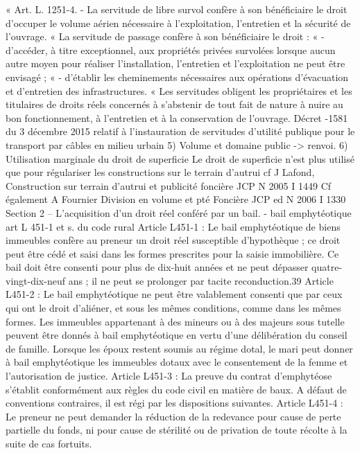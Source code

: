\documentclass[11pt,a4paper]{report}
\begin{document}
	« Art. L. 1251-4. - La servitude de libre survol confère à son bénéficiaire le droit d'occuper le volume aérien
	nécessaire à l'exploitation, l'entretien et la sécurité de l'ouvrage.
	« La servitude de passage confère à son bénéficiaire le droit :
	« - d'accéder, à titre exceptionnel, aux propriétés privées survolées lorsque aucun autre moyen pour réaliser
	l'installation, l'entretien et l'exploitation ne peut être envisagé ;
	« - d'établir les cheminements nécessaires aux opérations d'évacuation et d'entretien des infrastructures.
	« Les servitudes obligent les propriétaires et les titulaires de droits réels concernés à s'abstenir de tout fait de
	nature à nuire au bon fonctionnement, à l'entretien et à la conservation de l'ouvrage.
	Décret -1581 du 3 décembre 2015 relatif à l'instauration de servitudes d'utilité publique pour le transport
	par câbles en milieu urbain
	5) Volume et domaine public -> renvoi.
	6) Utilisation marginale du droit de superficie
	Le droit de superficie n’est plus utilisé que pour régulariser les constructions sur le terrain d’autrui cf J Lafond,
	Construction sur terrain d’autrui et publicité foncière JCP N 2005 I 1449
	Cf également A Fournier Division en volume et pté Foncière JCP ed N 2006 I 1330
	Section 2 – L’acquisition d’un droit réel conféré par un bail.
	- bail emphytéotique art L 451-1 et s. du code rural
	Article L451-1 : Le bail emphytéotique de biens immeubles confère au preneur un droit réel susceptible d'hypothèque ;
	ce droit peut être cédé et saisi dans les formes prescrites pour la saisie immobilière.
	Ce bail doit être consenti pour plus de dix-huit années et ne peut dépasser quatre-vingt-dix-neuf ans ; il ne peut se
	prolonger par tacite reconduction.39
	Article L451-2 : Le bail emphytéotique ne peut être valablement consenti que par ceux qui ont le droit d'aliéner, et sous
	les mêmes conditions, comme dans les mêmes formes.
	Les immeubles appartenant à des mineurs ou à des majeurs sous tutelle peuvent être donnés à bail emphytéotique en
	vertu d'une délibération du conseil de famille.
	Lorsque les époux restent soumis au régime dotal, le mari peut donner à bail emphytéotique les immeubles dotaux
	avec le consentement de la femme et l'autorisation de justice.
	Article L451-3 : La preuve du contrat d'emphytéose s'établit conformément aux règles du code civil en matière de baux.
	A défaut de conventions contraires, il est régi par les dispositions suivantes.
	Article L451-4 : Le preneur ne peut demander la réduction de la redevance pour cause de perte partielle du fonds, ni
	pour cause de stérilité ou de privation de toute récolte à la suite de cas fortuits.
\end{document}
